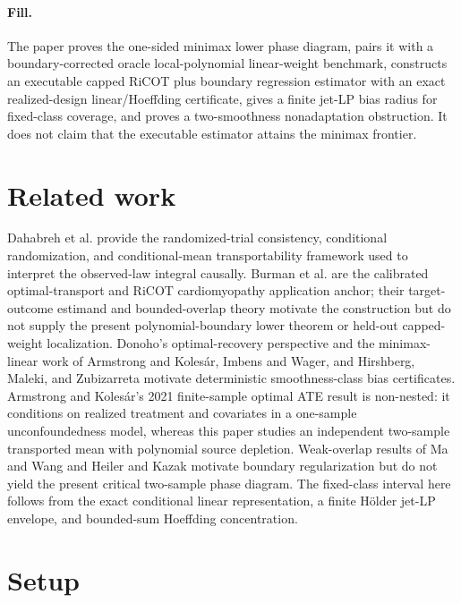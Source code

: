 \documentclass{article}
\begin{document}
\paragraph{Fill.} The paper proves the one-sided minimax lower phase diagram, pairs it with a boundary-corrected oracle local-polynomial linear-weight benchmark, constructs an executable capped RiCOT plus boundary regression estimator with an exact realized-design linear/Hoeffding certificate, gives a finite jet-LP bias radius for fixed-class coverage, and proves a two-smoothness nonadaptation obstruction. It does not claim that the executable estimator attains the minimax frontier.

\section{Related work}

Dahabreh et al. provide the randomized-trial consistency, conditional randomization, and conditional-mean transportability framework used to interpret the observed-law integral causally. Burman et al. are the calibrated optimal-transport and RiCOT cardiomyopathy application anchor; their target-outcome estimand and bounded-overlap theory motivate the construction but do not supply the present polynomial-boundary lower theorem or held-out capped-weight localization. Donoho's optimal-recovery perspective and the minimax-linear work of Armstrong and Kolesár, Imbens and Wager, and Hirshberg, Maleki, and Zubizarreta motivate deterministic smoothness-class bias certificates. Armstrong and Kolesár's 2021 finite-sample optimal ATE result is non-nested: it conditions on realized treatment and covariates in a one-sample unconfoundedness model, whereas this paper studies an independent two-sample transported mean with polynomial source depletion. Weak-overlap results of Ma and Wang and Heiler and Kazak motivate boundary regularization but do not yield the present critical two-sample phase diagram. The fixed-class interval here follows from the exact conditional linear representation, a finite Hölder jet-LP envelope, and bounded-sum Hoeffding concentration.

\section{Setup}
\end{document}
